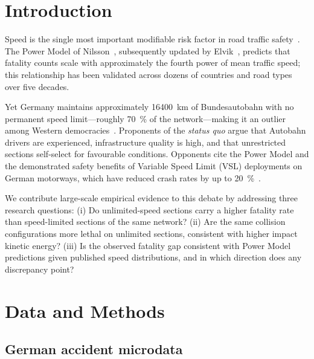 \documentclass[aps,prl,twocolumn,superscriptaddress,longbibliography]{revtex4-2}
\begin{document}
\section{Introduction}

Speed is the single most important modifiable risk factor in road traffic
safety~\cite{Aarts2006,Elvik2019}.
The Power Model of Nilsson~\cite{Nilsson2004}, subsequently updated by
Elvik~\cite{Elvik2013,Elvik2019}, predicts that fatality counts scale with
approximately the fourth power of mean traffic speed; this relationship has been
validated across dozens of countries and road types over five decades.

Yet Germany maintains approximately \SI{16400}{\kilo\metre} of Bundesautobahn
with no permanent speed limit---roughly \SI{70}{\percent} of the network---making it an
outlier among Western democracies~\cite{Bauernschuster2021}.
Proponents of the \textit{status quo} argue that Autobahn drivers are experienced,
infrastructure quality is high, and that unrestricted sections self-select for
favourable conditions.
Opponents cite the Power Model and the demonstrated safety benefits of Variable Speed
Limit (VSL) deployments on German motorways, which have reduced crash rates by
up to \SI{20}{\percent}~\cite{Bertini2006,Weikl2013}.

We contribute large-scale empirical evidence to this debate by addressing three
research questions:
(i) Do unlimited-speed sections carry a higher fatality rate than speed-limited
sections of the same network?
(ii) Are the same collision configurations more lethal on unlimited sections,
consistent with higher impact kinetic energy?
(iii) Is the observed fatality gap consistent with Power Model predictions given
published speed distributions, and in which direction does any discrepancy point?

\section{Data and Methods}

\subsection{German accident microdata}
\end{document}
